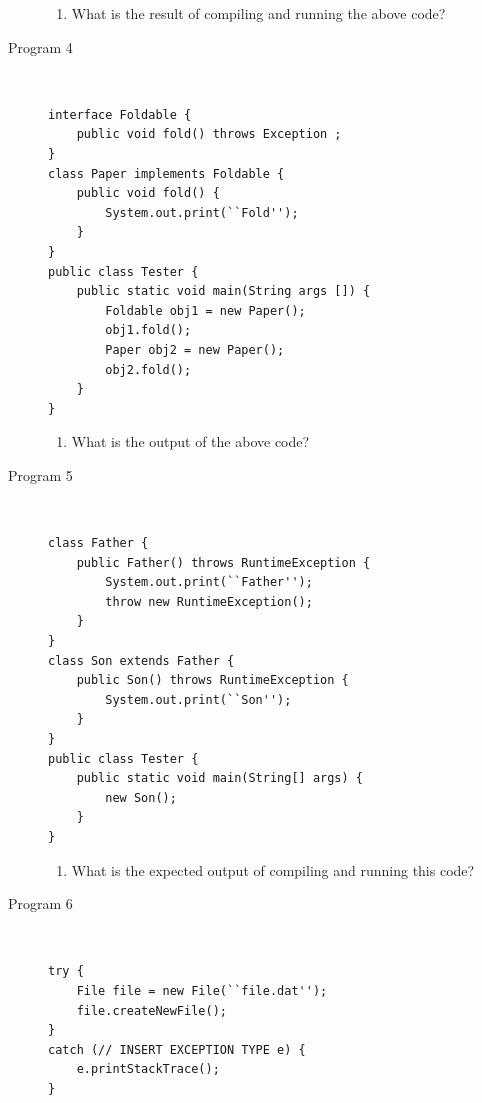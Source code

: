 \documentclass[11pt,a4paper]{article}
\def\AnswerBox{\fbox{\begin{minipage}{4in}\hfill\vspace{0.5in}\end{minipage}}}
\begin{document}
\begin{description}
\AnswerBox

\begin{enumerate}[label=\bfseries Q\arabic*:]\itemsep10pt
\item What is the result of compiling and running the above code?
    \end{enumerate}

\item [Program 4] \
\begin{lstlisting}
interface Foldable {
    public void fold() throws Exception ;
}
class Paper implements Foldable {
    public void fold() {
        System.out.print(``Fold'');
    }
}
public class Tester {
    public static void main(String args []) {
        Foldable obj1 = new Paper();
        obj1.fold(); 
        Paper obj2 = new Paper(); 
        obj2.fold();
    }
}
\end{lstlisting}

\AnswerBox

\begin{enumerate}[label=\bfseries Q\arabic*:]\itemsep10pt
\item What is the output of the above code?
\end{enumerate}

\item [Program 5] \
\begin{lstlisting}
class Father {
    public Father() throws RuntimeException {
        System.out.print(``Father'');
        throw new RuntimeException();
    }
}
class Son extends Father {
    public Son() throws RuntimeException {
        System.out.print(``Son'');
    }
}
public class Tester {
    public static void main(String[] args) {
        new Son(); 
    }
}
\end{lstlisting}

\AnswerBox

\begin{enumerate}[label=\bfseries Q\arabic*:]\itemsep10pt
\item What is the expected output of compiling and running this code?
    \end{enumerate}


\item [Program 6] \
\begin{lstlisting}
try {
    File file = new File(``file.dat'');
    file.createNewFile();
} 
catch (// INSERT EXCEPTION TYPE e) {
    e.printStackTrace();
}
\end{lstlisting}

\AnswerBox


\end{description}
\end{document}
